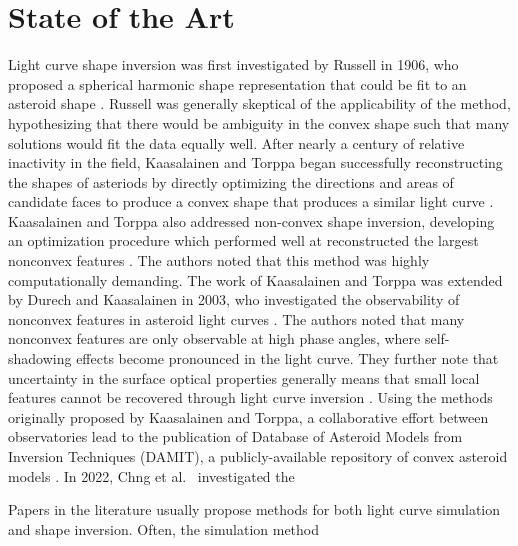 \section{State of the Art}

Light curve shape inversion was first investigated by Russell in 1906, who proposed a spherical harmonic shape representation that could be fit to an asteroid shape \cite{russell1906}. Russell was generally skeptical of the applicability of the method, hypothesizing that there would be ambiguity in the convex shape such that many solutions would fit the data equally well. After nearly a century of relative inactivity in the field, Kaasalainen and Torppa began successfully reconstructing the shapes of asteriods by directly optimizing the directions and areas of candidate faces to produce a convex shape that produces a similar light curve \cite{kaasalainen2000, kaasalainen2001}. Kaasalainen and Torppa also addressed non-convex shape inversion, developing an optimization procedure which performed well at reconstructed the largest nonconvex features \cite{kaasalainen2000}. The authors noted that this method was highly computationally demanding. The work of Kaasalainen and Torppa was extended by Durech and Kaasalainen in 2003, who investigated the observability of nonconvex features in asteroid light curves \cite{durech2003}. The authors noted that many nonconvex features are only observable at high phase angles, where self-shadowing effects become pronounced in the light curve. They further note that uncertainty in the surface optical properties generally means that small local features cannot be recovered through light curve inversion \cite{durech2003}. Using the methods originally proposed by Kaasalainen and Torppa, a collaborative effort between observatories lead to the publication of Database of Asteroid Models from Inversion Techniques (DAMIT), a publicly-available repository of convex asteroid models \cite{damit2014}. In 2022, Chng et al.~ investigated the 

Papers in the literature usually propose methods for both light curve simulation and shape inversion. Often, the simulation method

